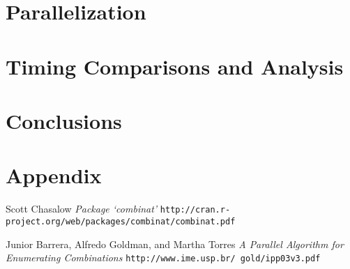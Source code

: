 \documentclass[12pt]{article}
\begin{document}
{\section{Parallelization}







\section{Timing Comparisons and Analysis}



\section{Conclusions}




\newpage

\appendix

\section{Appendix}



\newpage


\begin{thebibliography}{9}
Scott Chasalow
\textit{Package `combinat'}
\texttt{http://cran.r-project.org/web/packages/combinat/combinat.pdf}

Junior Barrera, Alfredo Goldman, and Martha Torres
\textit{A Parallel Algorithm for Enumerating Combinations}
\texttt{http://www.ime.usp.br/~gold/ipp03v3.pdf}
 

\end{thebibliography}


}
\end{document}
